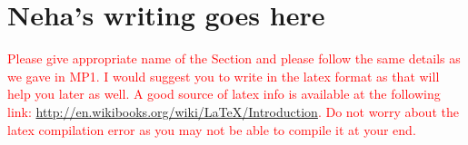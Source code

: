 \section{Neha's writing goes here}

\textcolor{red}{Please give appropriate name of the Section and please follow the same details as we gave in MP1. I would suggest you to write in the latex format as that will help you later as well. A good source of latex info is available at the following link: \url{http://en.wikibooks.org/wiki/LaTeX/Introduction}. Do not worry about the latex compilation error as you may not be able to compile it at your end.} 
